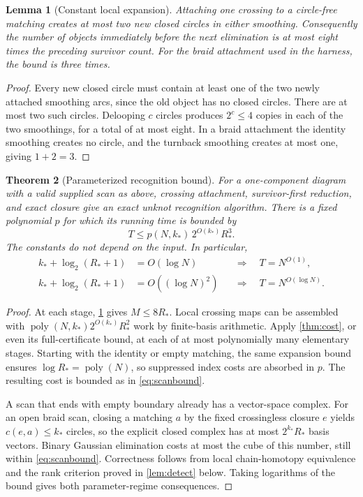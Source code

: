 \documentclass[11pt,letterpaper]{article}
\newtheorem{theorem}{Theorem}[section]
\newtheorem{lemma}[theorem]{Lemma}
\theoremstyle{definition}
\theoremstyle{remark}
\newcommand{\poly}{\operatorname{poly}}
\begin{document}
\begin{lemma}[Constant local expansion]\label{lem:expansion}
Attaching one crossing to a circle-free matching creates at most two new closed
circles in either smoothing. Consequently the number of objects immediately
before the next elimination is at most eight times the preceding survivor
count. For the braid attachment used in the harness, the bound is three times.
\end{lemma}
\begin{proof}
Every new closed circle must contain at least one of the two newly attached
smoothing arcs, since the old object has no closed circles. There are at most
two such circles. Delooping $c$ circles produces $2^c\leq4$ copies in each
of the two smoothings, for a total of at most eight. In a braid attachment the
identity smoothing creates no circle, and the turnback smoothing creates at
most one, giving $1+2=3$.
\end{proof}

\begin{theorem}[Parameterized recognition bound]\label{thm:qp}
For a one-component diagram with a valid supplied scan as above, crossing
attachment, survivor-first reduction, and exact closure give an exact unknot
recognition algorithm. There is a fixed polynomial $p$ for which its running
time is bounded by
\begin{equation}\label{eq:scanbound}
 T\leq p(N,k_*)\,2^{O(k_*)}R_*^3.
\end{equation}
The constants do not depend on the input. In particular,
\begin{align}
 k_*+\log_2(R_*+1)&=O(\log N)
       &&\Longrightarrow\quad T=N^{O(1)},\label{eq:polyregime}\\
 k_*+\log_2(R_*+1)&=O((\log N)^2)
       &&\Longrightarrow\quad T=N^{O(\log N)}.\label{eq:qpregime}
\end{align}
\end{theorem}
\begin{proof}
At each stage, \cref{lem:expansion} gives $M\leq8R_*$. Local crossing maps
can be assembled with $\poly(N,k_*)2^{O(k_*)}R_*^2$ work by finite-basis
arithmetic. Apply \cref{thm:cost}, or even its full-certificate bound, at each
of at most polynomially many elementary stages. Starting with the identity or
empty matching, the same expansion bound ensures $\log R_*=\poly(N)$,
so suppressed index costs are absorbed in $p$. The resulting cost is bounded
as in \cref{eq:scanbound}.

A scan that ends with empty boundary already has a vector-space complex.
For an open braid scan, closing a matching $a$ by the fixed crossingless
closure $e$ yields $c(e,a)\leq k_*$ circles, so the explicit closed complex
has at most $2^{k_*}R_*$ basis vectors. Binary Gaussian elimination costs at
most the cube of this number, still within \cref{eq:scanbound}. Correctness
follows from local chain-homotopy equivalence and the rank criterion proved
in \cref{lem:detect} below. Taking logarithms of the bound gives both
parameter-regime consequences.
\end{proof}
\end{document}
